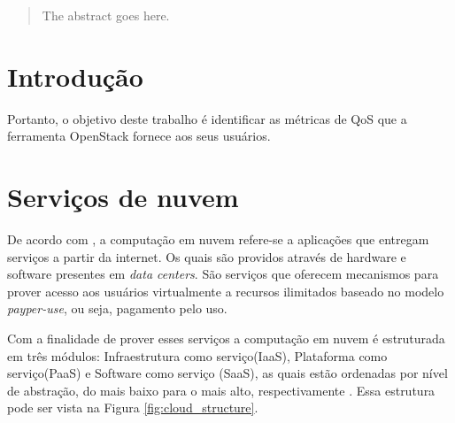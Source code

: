 \documentclass[conference]{IEEEtran}
\begin{document}
\maketitle

\begin{abstract}
The abstract goes here.
\end{abstract}





%
\IEEEpeerreviewmaketitle



\section{Introdução}
Portanto, o objetivo deste trabalho é identificar as métricas de QoS que a ferramenta OpenStack fornece aos seus usuários. %

\section{Serviços de nuvem}
De acordo com , a computação em nuvem refere-se a aplicações que entregam serviços a partir da internet. 
Os quais são providos através de hardware e software presentes em \textit{data centers}. São serviços que oferecem mecanismos
para prover acesso aos usuários virtualmente a recursos ilimitados baseado no modelo \textit{payper-use}, ou seja, pagamento
pelo uso. \cite{sefraoui2012openstack}

Com a finalidade de prover esses serviços a computação em nuvem é estruturada em três módulos: Infraestrutura como serviço(IaaS),
Plataforma como serviço(PaaS) e Software como serviço (SaaS), as quais estão ordenadas por nível de abstração, do mais baixo 
para o mais alto, respectivamente \cite{rehman2011teaching, sefraoui2012openstack, armbrust2010view, mell2011nist}. 
Essa estrutura pode ser vista na Figura \ref{fig:cloud_structure}.
\end{document}
